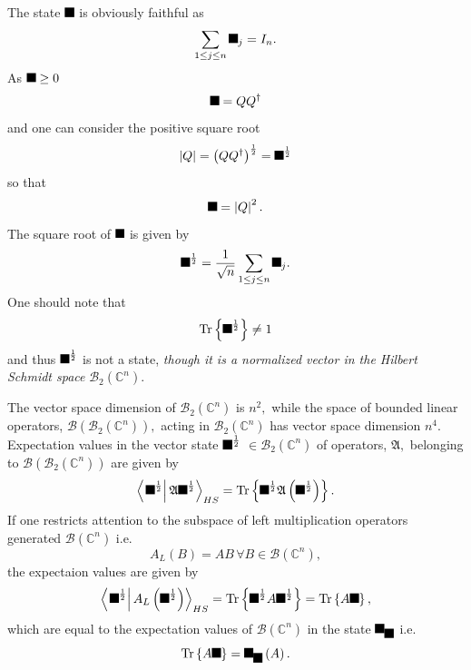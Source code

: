 \documentclass[aps,preprint]{revtex4}%
\providecommand{\U}[1]{\protect\rule{.1in}{.1in}}
\begin{document}
The state $\U{3c1} $ is obviously faithful as
\begin{equation}
\sum_{1\leq j\leq n}\U{3c1} _{j}=I_{n}.
\end{equation}
As $\U{3c1} \geq0$
\begin{equation}
\U{3c1} =QQ^{\dagger}%
\end{equation}
and one can consider the positive square root
\begin{equation}
\left\vert Q\right\vert =\left(  QQ^{\dagger}\right)  ^{\frac{1}{2}}=\U{3c1}
^{\frac{1}{2}}%
\end{equation}
so that
\begin{equation}
\U{3c1} =\left\vert Q\right\vert ^{2}.
\end{equation}
The square root of $\U{3c1} $ is given by
\begin{equation}
\U{3c1} ^{\frac{1}{2}}=\frac{1}{\sqrt{n}}\sum_{1\leq j\leq n}\U{3c1} _{j}.
\end{equation}
One should note that
\begin{equation}
\operatorname{Tr}\left\{  \U{3c1} ^{\frac{1}{2}}\right\}  \neq1
\end{equation}
and thus $\U{3c1} ^{\frac{1}{2}}$ is not a state, \emph{though it is a
normalized vector in the Hilbert Schmidt space} $\mathcal{B}_{2}%
(\mathbb{C}^{n}).$

The vector space dimension of $\mathcal{B}_{2}(\mathbb{C}^{n})$ is $n^{2},$
while the space of bounded linear operators, $\mathcal{B}\left(
\mathcal{B}_{2}(\mathbb{C}^{n})\right)  ,$ acting in $\mathcal{B}%
_{2}(\mathbb{C}^{n})$ has vector space dimension $n^{4}.$ Expectation values
in the vector state $\U{3c1} ^{\frac{1}{2}}$ $\in\mathcal{B}_{2}%
(\mathbb{C}^{n})$ of operators, $\mathfrak{A},$ belonging to $\mathcal{B}%
\left(  \mathcal{B}_{2}(\mathbb{C}^{n})\right)  $ are given by
\begin{equation}
\left\langle \left.  \U{3c1} ^{\frac{1}{2}}\right\vert \mathfrak{A}\U{3c1}
^{\frac{1}{2}}\right\rangle _{HS}=\operatorname{Tr}\left\{  \U{3c1} ^{\frac
{1}{2}}\mathfrak{A}\left(  \U{3c1} ^{\frac{1}{2}}\right)  \right\}  .
\end{equation}
If one restricts attention to the subspace of left multiplication operators
generated $\mathcal{B}(\mathbb{C}^{n})$ i.e.
\begin{equation}
A_{L}\left(  B\right)  =AB\,\forall B\in\mathcal{B}(\mathbb{C}^{n}),
\end{equation}
the expectaion values are given by
\begin{equation}
\left\langle \left.  \U{3c1} ^{\frac{1}{2}}\right\vert A_{L}\left(  \U{3c1}
^{\frac{1}{2}}\right)  \right\rangle _{HS}=\operatorname{Tr}\left\{  \U{3c1}
^{\frac{1}{2}}A\U{3c1} ^{\frac{1}{2}}\right\}  =\operatorname{Tr}\left\{
A\U{3c1} \right\}  ,
\end{equation}
which are equal to the expectation values of $\mathcal{B}(\mathbb{C}^{n})$ in
the state $\U{3c9} _{\U{3c1} }$ i.e.
\begin{equation}
\operatorname{Tr}\left\{  A\U{3c1} \right\}  =\U{3c9} _{\U{3c1} }\left(
A\right)  .
\end{equation}
\end{document}
